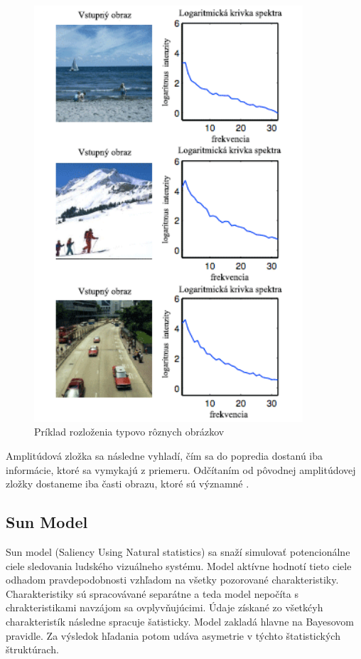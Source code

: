 \begin{figure}[H]
  \centering
  \includegraphics[width=10cm]{pics/spectral-img.png}
  \caption{Príklad rozloženia typovo rôznych obrázkov\cite{spectral-rezidual}}\label{wrap-fig:2}
\end{figure}
\vspace{10mm}

Amplitúdová zložka sa následne vyhladí, čím sa do popredia dostanú iba informácie, ktoré sa vymykajú z priemeru.
Odčítaním od pôvodnej amplitúdovej zložky dostaneme iba časti obrazu, ktoré sú významné \cite{spectral-rezidual}.
\subsection{Sun Model}
Sun model (Saliency Using Natural statistics) sa snaží simulovať potencionálne ciele sledovania ludského vizuálneho systému.
Model aktívne hodnotí tieto ciele odhadom pravdepodobnosti vzhľadom na všetky pozorované charakteristiky.
Charakteristiky sú spracovávané separátne a teda model nepočíta s chrakteristikami navzájom sa ovplyvňujúcimi.
Údaje získané zo všetkćyh charakteristík  následne spracuje šatisticky.
Model zakladá hlavne na Bayesovom pravidle.
Za výsledok hľadania potom udáva asymetrie v týchto štatistických štruktúrach\cite{sun-1}.
